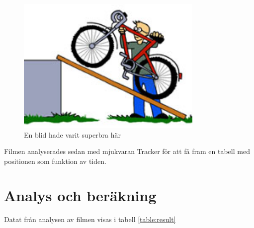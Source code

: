 \documentclass[11p, titlepage, oneside, a4paper]{article}
\begin{document}
        \begin{figure}[!h]
            \includegraphics[width=0.8\textwidth]{images/lutandePlan.jpg}
            \caption{En blid hade varit superbra här}
            \label{fig:lutandeplan}
        \end{figure}
        
        Filmen analyserades sedan med mjukvaran Tracker för att få fram en tabell med positionen som funktion av tiden.
    \newpage
	\section{Analys och beräkning}
        Datat från analysen av filmen visas i tabell \ref{table:result}
    
\end{document}
